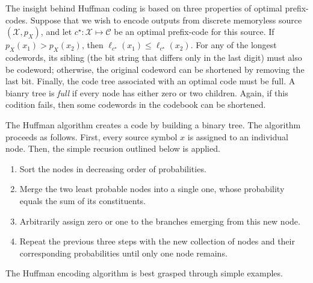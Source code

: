 The insight behind Huffman coding is based on three properties of optimal prefix-codes.
Suppose that we wish to encode outputs from discrete memoryless source $(\mathcal{X}, p_X)$, and let $c^{\star} : \mathcal{X} \mapsto \mathcal{C}$ be an optimal prefix-code for this source.
If $p_X(x_1) > p_X(x_2)$, then $\ell_{c^{\star}}(x_1) \leq \ell_{c^{\star}}(x_2)$.
For any of the longest codewords, its sibling (the bit string that differs only in the last digit) must also be codeword; otherwise, the original codeword can be shortened by removing the last bit.
Finally, the code tree associated with an optimal code must be full.
A bianry tree is \emph{full} if every node has either zero or two children.
Again, if this codition fails, then some codewords in the codebook can be shortened.

The Huffman algorithm creates a code by building a binary tree.
The algorithm proceeds as follows.
First, every source symbol $x$ is assigned to an individual node.
Then, the simple recusion outlined below is applied.
\begin{enumerate}
\item Sort the nodes in decreasing order of probabilities.
\item Merge the two least probable nodes into a single one, whose probability equals the sum of its constituents.
\item Arbitrarily assign zero or one to the branches emerging from this new node.
\item Repeat the previous three steps with the new collection of nodes and their corresponding probabilities until only one node remains.
\end{enumerate}
The Huffman encoding algorithm is best grasped through simple examples.


